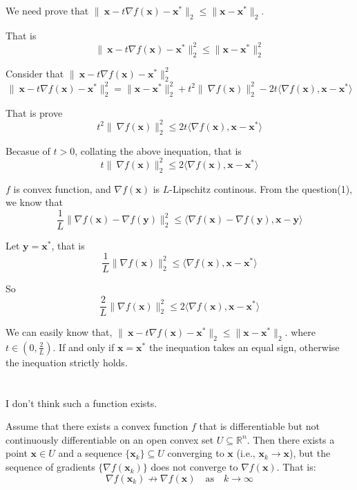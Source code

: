 \documentclass{article}
\begin{document}
We need prove that $ \|\ \mathbf{x} - t\nabla f(\mathbf{x}) - \mathbf{x}^*\|_2 \leq \|\mathbf{x} - \mathbf{x}^*\|_2 $.
 
That is
$$
\|\ \mathbf{x} - t\nabla f(\mathbf{x}) - \mathbf{x}^*\|_2^2 \leq \|\mathbf{x} - \mathbf{x}^*\|_2^2
$$
 
Consider that $\|\ \mathbf{x} - t\nabla f(\mathbf{x}) - \mathbf{x}^*\|_2^2$
$$
\|\ \mathbf{x} - t\nabla f(\mathbf{x}) - \mathbf{x}^*\|_2^2 = \| \mathbf{x} - \mathbf{x}^*\|_2^2 + t^2 \|\ \nabla f(\mathbf{x}) \|_2^2 -2t \langle\nabla f(\mathbf{x}), \mathbf{x} - \mathbf{x}^* \rangle
$$ 

That is prove
$$
 t^2 \|\ \nabla f(\mathbf{x}) \|_2^2 \leq 2t \langle\nabla f(\mathbf{x}), \mathbf{x} - \mathbf{x}^* \rangle
$$

Becasue of $ t>0 $, collating the above inequation, that is
$$
t \|\ \nabla f(\mathbf{x}) \|_2^2 \leq 2 \langle\nabla f(\mathbf{x}), \mathbf{x} - \mathbf{x}^* \rangle
$$

$f$ is convex function, and $\nabla f(\mathbf{x})$ is $L$-Lipschitz continous. From the question(1), we know that
$$
\frac{1}{L} \|\nabla f(\mathbf{x}) - \nabla f(\mathbf{y})\|_2^2 \leq \langle \nabla f(\mathbf{x})-\nabla f(\mathbf{y}), \mathbf{x} - \mathbf{y} \rangle
$$

Let $\mathbf{y} =\mathbf{x}^* $, that is
$$
\frac{1}{L} \|\nabla f(\mathbf{x})\|_2^2 \leq \langle \nabla f(\mathbf{x}), \mathbf{x} - \mathbf{x}^* \rangle
$$

So
$$
\frac{2}{L} \|\nabla f(\mathbf{x})\|_2^2 \leq 2 \langle \nabla f(\mathbf{x}), \mathbf{x} - \mathbf{x}^* \rangle
$$

We can easily know that, $ \|\ \mathbf{x} - t\nabla f(\mathbf{x}) - \mathbf{x}^*\|_2 \leq \|\mathbf{x} - \mathbf{x}^*\|_2 $. where $t \in (0,\frac{2}{L}) $. If and only if $ \mathbf{x}= \mathbf{x}^*$ the inequation takes an equal sign, otherwise the inequation strictly holds.

\section{}

I don't think such a function exists.

Assume that there exists a convex function $ f $ that is differentiable but not continuously differentiable on an open convex set $ U \subseteq \mathbb{R}^n $. Then there exists a point $ \mathbf{x} \in U $ and a sequence $ \{\mathbf{x}_k\} \subseteq U $ converging to $ \mathbf{x} $ (i.e., $ \mathbf{x}_k \to \mathbf{x} $), but the sequence of gradients $ \{\nabla f(\mathbf{x}_k)\} $ does not converge to $ \nabla f(\mathbf{x}) $. That is:
$$
\nabla f(\mathbf{x}_k) \nrightarrow \nabla f(\mathbf{x}) \quad \text{as} \quad k \to \infty
$$
\end{document}
